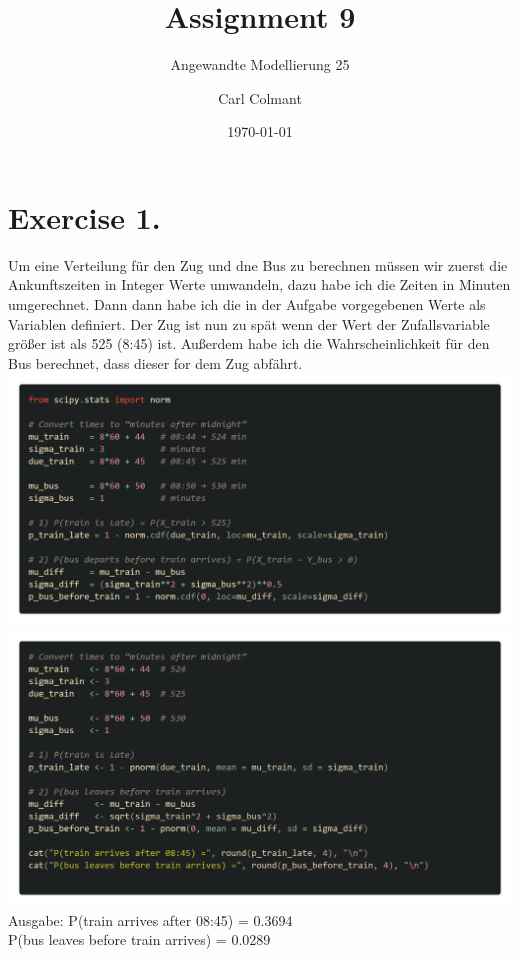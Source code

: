 \documentclass{scrartcl}
\title{Assignment 9}
\subtitle{Angewandte Modellierung 25}
\author{Carl Colmant}
\date{\today}
\begin{document}
\maketitle
\newpage
\section*{Exercise 1. }
Um eine Verteilung für den Zug und dne Bus zu berechnen müssen wir zuerst die Ankunftszeiten in Integer Werte umwandeln, dazu habe ich die Zeiten in Minuten umgerechnet. Dann dann habe ich die in der Aufgabe vorgegebenen Werte als Variablen definiert. Der Zug ist nun zu spät wenn der Wert der Zufallsvariable größer ist als 525 (8:45) ist. Außerdem habe ich die Wahrscheinlichkeit für den Bus berechnet, dass dieser for dem Zug abfährt.\\
\includegraphics*[scale=0.24]{Bus_pi.png}\\
\includegraphics*[scale=0.24]{Bus_R.png}\\
Ausgabe: 
P(train arrives after 08:45) = 0.3694\\
P(bus leaves before train arrives) = 0.0289
\end{document}
